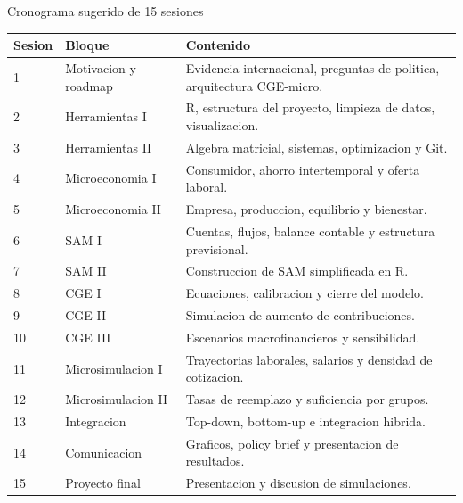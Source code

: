 \documentclass[10pt,aspectratio=169]{beamer}
\begin{document}
\begin{frame}{Cronograma sugerido de 15 sesiones}
\scriptsize
\begin{tabular}{p{1.1cm} p{4.2cm} p{6.7cm}}
\toprule
\textbf{Sesion} & \textbf{Bloque} & \textbf{Contenido} \\
\midrule
1 & Motivacion y roadmap & Evidencia internacional, preguntas de politica, arquitectura CGE-micro. \\
2 & Herramientas I & R, estructura del proyecto, limpieza de datos, visualizacion. \\
3 & Herramientas II & Algebra matricial, sistemas, optimizacion y Git. \\
4 & Microeconomia I & Consumidor, ahorro intertemporal y oferta laboral. \\
5 & Microeconomia II & Empresa, produccion, equilibrio y bienestar. \\
6 & SAM I & Cuentas, flujos, balance contable y estructura previsional. \\
7 & SAM II & Construccion de SAM simplificada en R. \\
8 & CGE I & Ecuaciones, calibracion y cierre del modelo. \\
9 & CGE II & Simulacion de aumento de contribuciones. \\
10 & CGE III & Escenarios macrofinancieros y sensibilidad. \\
11 & Microsimulacion I & Trayectorias laborales, salarios y densidad de cotizacion. \\
12 & Microsimulacion II & Tasas de reemplazo y suficiencia por grupos. \\
13 & Integracion & Top-down, bottom-up e integracion hibrida. \\
14 & Comunicacion & Graficos, policy brief y presentacion de resultados. \\
15 & Proyecto final & Presentacion y discusion de simulaciones. \\
\bottomrule
\end{tabular}
\end{frame}
\end{document}
